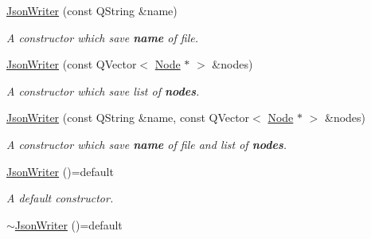 \begin{DoxyCompactItemize}
\item 
\mbox{\label{class_json_writer_a5458b7bff2acba6b3f9ac4b776baf279}} 
\mbox{\hyperlink{class_json_writer_a5458b7bff2acba6b3f9ac4b776baf279}{Json\+Writer}} (const Q\+String \&name)
\begin{DoxyCompactList}\small\item\em A {\itshape constructor} which save {\bfseries{name}} of {\itshape file}. \end{DoxyCompactList}\item 
\mbox{\label{class_json_writer_ad6c3ee66a29dea6f3adb7620a57588eb}} 
\mbox{\hyperlink{class_json_writer_ad6c3ee66a29dea6f3adb7620a57588eb}{Json\+Writer}} (const Q\+Vector$<$ \mbox{\hyperlink{class_node}{Node}} $\ast$ $>$ \&nodes)
\begin{DoxyCompactList}\small\item\em A {\itshape constructor} which save list of {\bfseries{nodes}}. \end{DoxyCompactList}\item 
\mbox{\label{class_json_writer_af65af2f72afc8d02cf64570bf2416050}} 
\mbox{\hyperlink{class_json_writer_af65af2f72afc8d02cf64570bf2416050}{Json\+Writer}} (const Q\+String \&name, const Q\+Vector$<$ \mbox{\hyperlink{class_node}{Node}} $\ast$ $>$ \&nodes)
\begin{DoxyCompactList}\small\item\em A {\itshape constructor} which save {\bfseries{name}} of {\itshape file} and list of {\bfseries{nodes}}. \end{DoxyCompactList}\item 
\mbox{\label{class_json_writer_acba8e767c0027b578801970a790a30e1}} 
\mbox{\hyperlink{class_json_writer_acba8e767c0027b578801970a790a30e1}{Json\+Writer}} ()=default
\begin{DoxyCompactList}\small\item\em A {\itshape default} {\itshape constructor}. \end{DoxyCompactList}\item 
\mbox{\label{class_json_writer_ad42c42cdd46a5cec2334a6e4aab1da08}} 
\mbox{\hyperlink{class_json_writer_ad42c42cdd46a5cec2334a6e4aab1da08}{$\sim$\+Json\+Writer}} ()=default

\end{DoxyCompactItemize}
